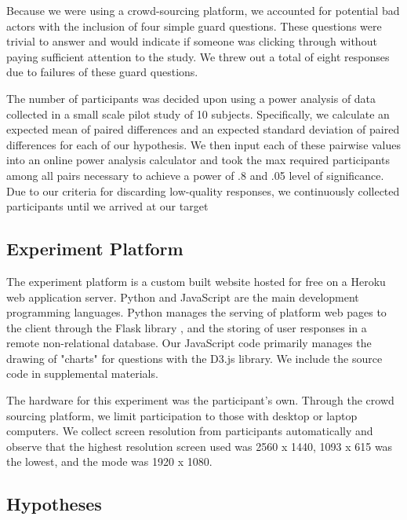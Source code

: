    
    Because we were using a crowd-sourcing platform, we accounted for potential bad actors with the inclusion of four simple guard questions. These questions were trivial to answer and would indicate if someone was clicking through without paying sufficient attention to the study. We threw out a total of eight responses due to failures of these guard questions. 
    
    The number of participants was decided upon using a power analysis of data collected in a small scale pilot study of 10 subjects. Specifically, we calculate an expected mean of paired differences and an expected standard deviation of paired differences for each of our hypothesis. We then input each of these pairwise values into an online power analysis calculator  and took the max required participants among all pairs necessary to achieve a power of .8 and .05 level of significance. Due to our criteria for discarding low-quality responses, we continuously collected participants until we arrived at our target 

\subsection{Experiment Platform}
    The experiment platform is a custom built website hosted for free on a Heroku web application server.\cite{experiment_platform} Python and JavaScript are the main development programming languages. Python manages the serving of platform web pages to the client through the Flask library \cite{flask}, and the storing of user responses in a remote non-relational database. Our JavaScript code primarily manages the drawing of "charts" for questions with the D3.js library. We include the source code in supplemental materials.
    
    The hardware for this experiment was the participant's own. Through the crowd sourcing platform, we limit participation to those with desktop or laptop computers. We collect screen resolution from participants automatically and observe that the highest resolution screen used was 2560 x 1440, 1093 x 615 was the lowest, and the mode was 1920 x 1080. 
    
\subsection{Hypotheses}

